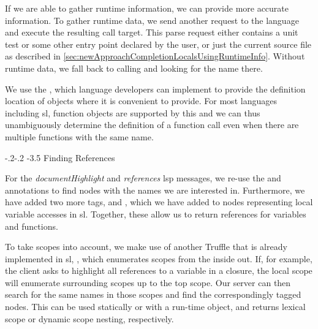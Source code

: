 \documentclass[sigplan,10pt,screen]{acmart}
\makeatletter
\renewcommand\paragraph{\@startsection{paragraph}{4}{\z@}%
   {-.2\baselineskip \@plus -2\p@ \@minus -.2\p@}%
   {-3.5\p@}%
   {\@parfont\@addspaceafter}}
\renewcommand\subparagraph{\@startsection{subparagraph}{5}{\z@}%
   {-.2\baselineskip \@plus -2\p@ \@minus -.2\p@}%
   {-3.5\p@}%
   {\@subparfont\@addspaceafter}}
\makeatother
\begin{document}
If we are able to gather runtime information, we can provide more accurate
information. To gather runtime data, we send another  request
to the language and execute the resulting call target. This parse request either
contains a unit test or some other entry point declared by the user, or just the
current source file as described in
\autoref{sec:newApproachCompletionLocalsUsingRuntimeInfo}. Without runtime data,
we fall back to calling  and looking for the name
there.

We use the  \api, which
language developers can implement to provide the definition location of
objects where it is convenient to provide. For most languages including
\ac{sl}, function objects are supported by this \api and we can thus
unambiguously determine the definition of a function call even when there are
multiple functions with the same name.

\subparagraph{Finding References}

For the \emph{documentHighlight} and \emph{references} \ac{lsp} messages, we
re-use the  and  annotations to
find nodes with the names we are interested in. Furthermore, we have added two
more tags,  and , which
we have added to nodes representing local variable accesses in
\ac{sl}. Together, these allow us to return references for variables and
functions.

To take scopes into account, we make use of another Truffle \api that is already
implemented in \ac{sl}, , which enumerates scopes
from the inside out. If, for example, the client asks to highlight all
references to a variable in a closure, the local scope \api will enumerate
surrounding scopes up to the top scope. Our server can then search for the same
names in those scopes and find the correspondingly tagged nodes. This \api can
be used statically or with a run-time  object, and returns
lexical scope or dynamic scope nesting, respectively.

\end{document}
